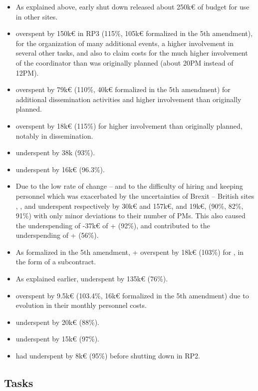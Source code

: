 \begin{itemize}
\item As explained above,  early shut down released about
  250k€ of budget for use in other sites.
\item {} overspent by 150k€ in RP3 (115\%, 105k€ formalized in
  the 5th amendment), for the organization of many additional events,
  a higher involvement in several other tasks, and also to claim costs
  for the much higher involvement of the coordinator than was
  originally planned (about 20PM instead of 12PM).
\item {} overspent by 79k€ (110\%, 40k€ formalized in the 5th
  amendment) for additional dissemination activities and higher
  involvement than originally planned.
\item {} overspent by 18k€ (115\%) for higher involvement than
  originally planned, notably in dissemination.
\item {} underspent by 38k (93\%).
\item {} underspent by 16k€ (96.3\%).
\item Due to the low rate of change -- and to the difficulty of
  hiring and keeping personnel which was exacerbated by the uncertainties
  of Brexit -- British sites ,
  , and  underspent respectively by 30k€ and 157k€,
  and 19k€, (90\%, 82\%, 91\%) with only minor deviations to their
  number of PMs. This also caused the underspending of -37k€ of
  + (92\%), and contributed to the underspending
  of + (56\%).
\item As formalized in the 5th amendment, + overspent by 18k€
  (103\%) for , in the form of a subcontract.
\item As explained earlier,  underspent by 135k€ (76\%).
\item {} overspent by 9.5k€ (103.4\%, 16k€ formalized in the 5th
  amendment) due to evolution in their monthly personnel costs.
\item {} underspent by 20k€ (88\%).
\item {} underspent by 15k€ (97\%).
\item {} had underspent by 8k€ (95\%) before shutting down in
  RP2.
\end{itemize}

\subsection{Tasks}

